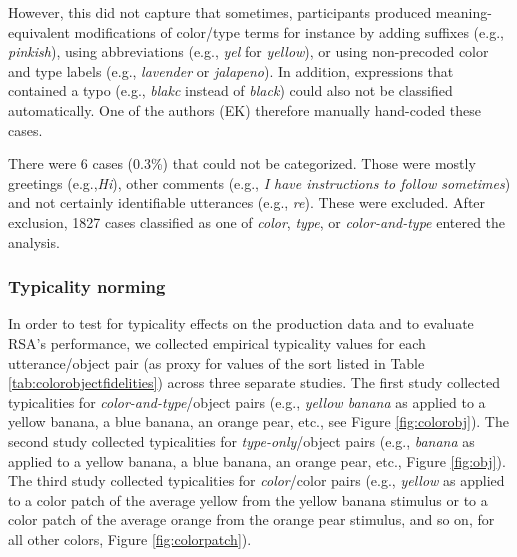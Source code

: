 \documentclass[11pt]{article}
\newcommand{\tableref}[1]{Table \ref{#1}}
\newcommand{\figref}[1]{Figure \ref{#1}}
\begin{document}
However, this did not capture that sometimes, participants produced meaning-equivalent modifications of color/type terms for instance by adding suffixes (e.g., \emph{pinkish}), using abbreviations (e.g., \emph{yel} for \emph{yellow}), or using non-precoded color and type labels (e.g., \emph{lavender} or \emph{jalapeno}). In addition, expressions that contained a typo (e.g., \emph{blakc} instead of \emph{black}) could also not be classified automatically. One of the authors (EK) therefore manually hand-coded these cases.

There were 6 cases (0.3\%) that could not be categorized. Those were mostly greetings (e.g.,\emph{Hi}), other comments (e.g., \emph{I have instructions to follow sometimes}) and not certainly identifiable utterances (e.g., \emph{re}). These were excluded. After exclusion, 1827 cases classified as one of \emph{color}, \emph{type}, or \emph{color-and-type} entered the analysis.


\subsubsection{Typicality norming}
\label{sec:typicalitynormingcolor}

In order to test for typicality effects on the production data and to evaluate RSA's performance, we collected empirical typicality values for each utterance/object pair (as proxy for values of the sort listed in \tableref{tab:colorobjectfidelities}) across three separate studies. The first study collected typicalities for \emph{color-and-type}/object pairs (e.g., \emph{yellow banana} as applied to a yellow banana, a blue banana, an orange pear, etc., see \figref{fig:colorobj}). The second study collected typicalities for \emph{type-only}/object pairs (e.g., \emph{banana} as applied to a yellow banana, a blue banana, an orange pear, etc., \figref{fig:obj}). The third study collected typicalities for \emph{color}/color pairs (e.g., \emph{yellow} as applied to a color patch of the average yellow from the yellow banana stimulus or to a color patch of the average orange from the orange pear stimulus, and so on, for all other colors, \figref{fig:colorpatch}). 
\end{document}
